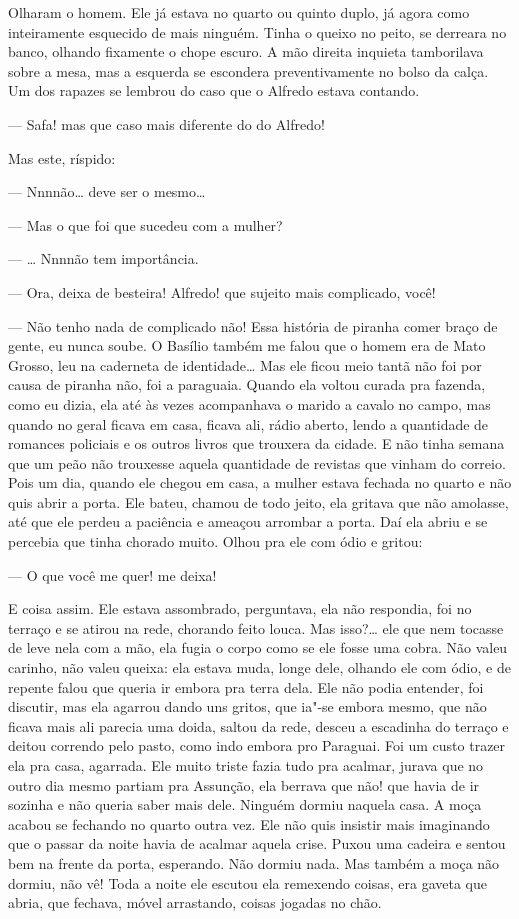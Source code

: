 Olharam o homem. Ele já estava no quarto ou quinto duplo, já agora como
inteiramente esquecido de mais ninguém. Tinha o queixo no peito, se
derreara no banco, olhando fixamente o chope escuro. A mão direita
inquieta tamborilava sobre a mesa, mas a esquerda se escondera
preventivamente no bolso da calça. Um dos rapazes se lembrou do caso que
o Alfredo estava contando.

--- Safa! mas que caso mais diferente do do Alfredo!

Mas este, ríspido:

--- Nnnnão\ldots{} deve ser o mesmo\ldots{}

--- Mas o que foi que sucedeu com a mulher?

--- \ldots{} Nnnnão tem importância.

--- Ora, deixa de besteira! Alfredo! que sujeito mais complicado, você!

--- Não tenho nada de complicado não! Essa história de piranha comer
braço de gente, eu nunca soube. O Basílio também me falou que o homem
era de Mato Grosso, leu na caderneta de identidade\ldots{} Mas ele ficou meio
tantã não foi por causa de piranha não, foi a paraguaia. Quando ela
voltou curada pra fazenda, como eu dizia, ela até às vezes acompanhava o
marido a cavalo no campo, mas quando no geral ficava em casa, ficava
ali, rádio aberto, lendo a quantidade de romances policiais e os outros
livros que trouxera da cidade. E não tinha semana que um peão não
trouxesse aquela quantidade de revistas que vinham do correio. Pois um
dia, quando ele chegou em casa, a mulher estava fechada no quarto e não
quis abrir a porta. Ele bateu, chamou de todo jeito, ela gritava que não
amolasse, até que ele perdeu a paciência e ameaçou arrombar a porta. Daí
ela abriu e se percebia que tinha chorado muito. Olhou pra ele com ódio
e gritou:

--- O que você me quer! me deixa!

E coisa assim. Ele estava assombrado, perguntava, ela não respondia, foi
no terraço e se atirou na rede, chorando feito louca. Mas isso?\ldots{} ele
que nem tocasse de leve nela com a mão, ela fugia o corpo como se ele
fosse uma cobra. Não valeu carinho, não valeu queixa: ela estava muda,
longe dele, olhando ele com ódio, e de repente falou que queria ir
embora pra terra dela. Ele não podia entender, foi discutir, mas ela
agarrou dando uns gritos, que ia"-se embora mesmo, que não ficava mais
ali parecia uma doida, saltou da rede, desceu a escadinha do terraço e
deitou correndo pelo pasto, como indo embora pro Paraguai. Foi um custo
trazer ela pra casa, agarrada. Ele muito triste fazia tudo pra acalmar,
jurava que no outro dia mesmo partiam pra Assunção, ela berrava que não!
que havia de ir sozinha e não queria saber mais dele. Ninguém dormiu
naquela casa. A moça acabou se fechando no quarto outra vez. Ele não
quis insistir mais imaginando que o passar da noite havia de acalmar
aquela crise. Puxou uma cadeira e sentou bem na frente da porta,
esperando. Não dormiu nada. Mas também a moça não dormiu, não vê! Toda a
noite ele escutou ela remexendo coisas, era gaveta que abria, que
fechava, móvel arrastando, coisas jogadas no chão.

